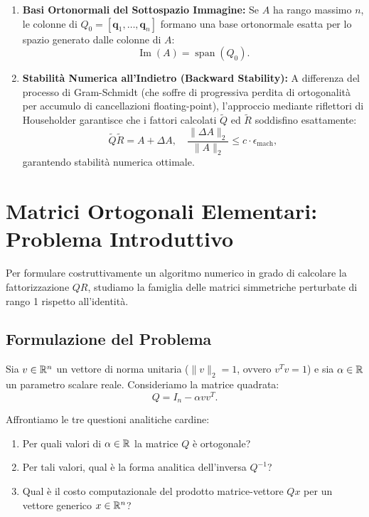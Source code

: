 \begin{enumerate}
    \item \textbf{Basi Ortonormali del Sottospazio Immagine:}
    Se $A$ ha rango massimo $n$, le colonne di $Q_0 = [\mathbf{q}_1, \dots, \mathbf{q}_n]$ formano una base ortonormale esatta per lo spazio generato dalle colonne di $A$:
    \begin{equation}
        \operatorname{Im}(A) = \operatorname{span}(Q_0).
    \end{equation}

    \item \textbf{Stabilit\`a Numerica all'Indietro (Backward Stability):}
    A differenza del processo di Gram-Schmidt (che soffre di progressiva perdita di ortogonalit\`a per accumulo di cancellazioni floating-point), l'approccio mediante riflettori di Householder garantisce che i fattori calcolati $\tilde{Q}$ ed $\tilde{R}$ soddisfino esattamente:
    \begin{equation}
        \tilde{Q} \tilde{R} = A + \Delta A, \quad \frac{\|\Delta A\|_2}{\|A\|_2} \le c \cdot \epsilon_{\text{mach}},
    \end{equation}
    garantendo stabilit\`a numerica ottimale.
\end{enumerate}

\FloatBarrier
\section{Matrici Ortogonali Elementari: Problema Introduttivo}
\label{sec:matrici-ortogonali-elementari}

Per formulare costruttivamente un algoritmo numerico in grado di calcolare la fattorizzazione $QR$, studiamo la famiglia delle matrici simmetriche perturbate di rango 1 rispetto all'identit\`a.

\subsection{Formulazione del Problema}
Sia $v \in \mathbb{R}^n$ un vettore di norma unitaria ($\|v\|_2 = 1$, ovvero $v^T v = 1$) e sia $\alpha \in \mathbb{R}$ un parametro scalare reale. Consideriamo la matrice quadrata:
\begin{equation}
    Q = I_n - \alpha v v^T.
    \label{eq:forma-matrice-alfa}
\end{equation}

Affrontiamo le tre questioni analitiche cardine:
\begin{enumerate}
    \item Per quali valori di $\alpha \in \mathbb{R}$ la matrice $Q$ \`e ortogonale?
    \item Per tali valori, qual \`e la forma analitica dell'inversa $Q^{-1}$?
    \item Qual \`e il costo computazionale del prodotto matrice-vettore $Q x$ per un vettore generico $x \in \mathbb{R}^n$?
\end{enumerate}

